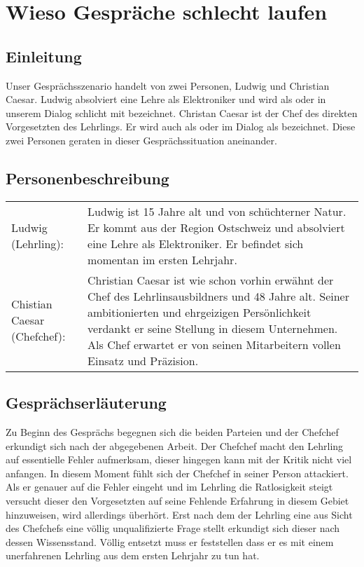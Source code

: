 \section*{Wieso Gespräche schlecht laufen}
\subsection*{Einleitung}
Unser Gesprächsszenario handelt von zwei Personen, Ludwig und Christian
Caesar. Ludwig absolviert eine Lehre als Elektroniker und wird als
 oder in unserem Dialog schlicht mit
bezeichnet. Christan Caesar ist der Chef des direkten
Vorgesetzten des Lehrlings. Er wird auch als oder
im Dialog als bezeichnet. Diese zwei Personen geraten
in dieser Gesprächssituation aneinander.

\subsection*{Personenbeschreibung}
\begin{tabular}{p{150pt}p{280pt}}
Ludwig (Lehrling):	&
Ludwig ist 15 Jahre alt und von schüchterner Natur. Er kommt aus der Region Ostschweiz und absolviert eine Lehre als Elektroniker. Er befindet sich momentan im ersten Lehrjahr.\\ 
Chistian Caesar (Chefchef): & 
Christian Caesar ist wie schon vorhin erwähnt  der Chef des Lehrlinsausbildners und 48 Jahre alt. Seiner ambitionierten und ehrgeizigen Persönlichkeit verdankt er seine Stellung in diesem Unternehmen. Als Chef erwartet er von seinen 		Mitarbeitern vollen Einsatz und Präzision.
\end{tabular}

\subsection*{Gesprächserläuterung}
Zu Beginn des Gesprächs begegnen sich die beiden Parteien und der
Chefchef erkundigt sich nach der abgegebenen Arbeit. Der Chefchef
macht den Lehrling auf essentielle Fehler aufmerksam, dieser hingegen
kann mit der Kritik nicht viel anfangen. In diesem Moment fühlt sich
der Chefchef in seiner Person attackiert. Als er genauer auf die
Fehler eingeht und im Lehrling die Ratlosigkeit steigt versucht dieser
den Vorgesetzten auf seine Fehlende Erfahrung in diesem Gebiet
hinzuweisen, wird allerdings überhört. Erst nach dem der Lehrling eine
aus Sicht des Chefchefs eine völlig unqualifizierte Frage stellt
erkundigt sich dieser nach dessen Wissensstand. Völlig entsetzt muss
er feststellen dass er es mit einem unerfahrenen Lehrling aus dem
ersten Lehrjahr zu tun hat.

